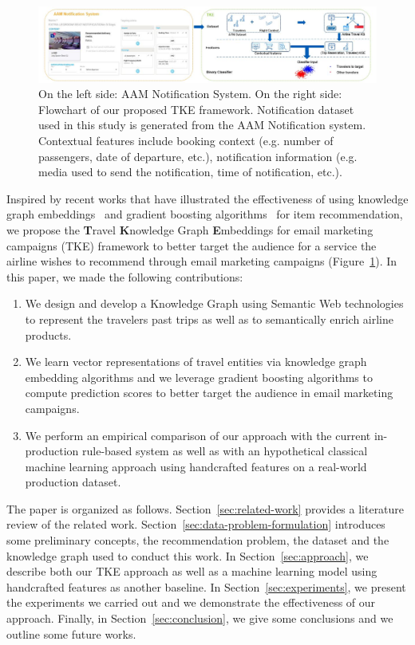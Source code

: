 \documentclass[11pt,dvipdfm]{article}
\begin{document}
\begin{figure}[htbp]
  \centering
  \includegraphics[width=\linewidth, height=4 cm]{submissions/email_marketing/figs/AAM_Notif_TKE-approach.PNG}
  \caption{On the left side: AAM Notification System. On the right side: Flowchart of our proposed TKE framework. Notification dataset used in this study is generated from the AAM Notification system. Contextual features include booking context (e.g. number of passengers, date of departure, etc.), notification information (e.g. media used to send the notification, time of notification, etc.).}
  \label{fig:TKE-approach}
\end{figure}

Inspired by recent works that have illustrated the effectiveness of using knowledge graph embeddings~\cite{Palumbo18, Sun18, Palumbo20} and gradient boosting algorithms~\cite{Pawel19, Schifferer20} for item recommendation, we propose the \textbf{T}ravel \textbf{K}nowledge Graph \textbf{E}mbeddings for email marketing campaigns (TKE) framework to better target the audience for a service the airline wishes to recommend through email marketing campaigns (Figure~\ref{fig:TKE-approach}). In this paper, we made the following contributions:
\begin{enumerate}
    \item We design and develop a Knowledge Graph using Semantic Web technologies to represent the travelers past trips as well as to semantically enrich airline products. 
    \item We learn vector representations of travel entities via knowledge graph embedding algorithms and we leverage gradient boosting algorithms to compute prediction scores to better target the audience in email marketing campaigns.
    \item We perform an empirical comparison of our approach with the current in-production rule-based system as well as with an hypothetical classical machine learning approach using handcrafted features on a real-world production dataset.
\end{enumerate}

The paper is organized as follows. Section~\ref{sec:related-work} provides a literature review of the related work. Section~\ref{sec:data-problem-formulation} introduces some preliminary concepts, the recommendation problem, the dataset and the knowledge graph used to conduct this work. In Section~\ref{sec:approach}, we describe both our TKE approach as well as a machine learning model using handcrafted features as another baseline. In Section~\ref{sec:experiments}, we present the experiments we carried out and we demonstrate the effectiveness of our approach. Finally, in Section~\ref{sec:conclusion}, we give some conclusions and we outline some future works.
\end{document}
